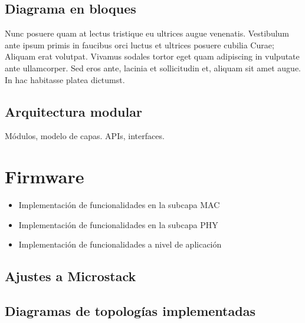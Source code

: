 \subsection{Diagrama en bloques}

Nunc posuere quam at lectus tristique eu ultrices augue venenatis. Vestibulum ante ipsum primis in faucibus orci luctus et ultrices posuere cubilia Curae; Aliquam erat volutpat. Vivamus sodales tortor eget quam adipiscing in vulputate ante ullamcorper. Sed eros ante, lacinia et sollicitudin et, aliquam sit amet augue. In hac habitasse platea dictumst.

\subsection{Arquitectura modular}

Módulos, modelo de capas. APIs, interfaces.

\section{Firmware}
\label{sec:firm}

\begin{itemize}
	\item Implementación de funcionalidades en la subcapa MAC

	\item Implementación de funcionalidades en la subcapa PHY

	\item Implementación de funcionalidades a nivel de aplicación
	
\end{itemize}

\subsection{Ajustes a Microstack}


\subsection{Diagramas de topologías implementadas}


